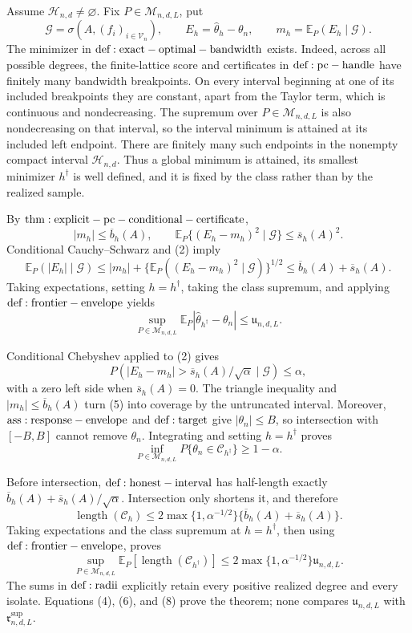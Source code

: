Assume \(\mathcal H_{n,d}\ne\varnothing\).  Fix \(P\in\mathcal M_{n,d,L}\), put
\[
 \mathcal G=\sigma\!\left(A,(f_i)_{i\in\mathcal V_n}\right),
 \qquad E_h=\widehat\theta_h-\theta_n,
 \qquad m_h=\mathbb E_P(E_h\mid\mathcal G).
\tag{1}
\]
The minimizer in \({\rm def:exact-optimal-bandwidth}\) exists.  Indeed, across all possible degrees, the finite-lattice score and certificates in \({\rm def:pc-handle}\) have finitely many bandwidth breakpoints.  On every interval beginning at one of its included breakpoints they are constant, apart from the Taylor term, which is continuous and nondecreasing.  The supremum over \(P\in\mathcal M_{n,d,L}\) is also nondecreasing on that interval, so the interval minimum is attained at its included left endpoint.  There are finitely many such endpoints in the nonempty compact interval \(\mathcal H_{n,d}\).  Thus a global minimum is attained, its smallest minimizer \(h^\dagger\) is well defined, and it is fixed by the class rather than by the realized sample.

By \({\rm thm:explicit-pc-conditional-certificate}\),
\[
 |m_h|\leq\overline b_h(A),
 \qquad
 \mathbb E_P\{(E_h-m_h)^2\mid\mathcal G\}\leq\overline s_h(A)^2.
\tag{2}
\]
Conditional Cauchy--Schwarz and (2) imply
\[
 \mathbb E_P(|E_h|\mid\mathcal G)
 \leq |m_h|+\{\mathbb E_P((E_h-m_h)^2\mid\mathcal G)\}^{1/2}
 \leq\overline b_h(A)+\overline s_h(A).
\tag{3}
\]
Taking expectations, setting \(h=h^\dagger\), taking the class supremum, and applying \({\rm def:frontier-envelope}\) yields
\[
 \sup_{P\in\mathcal M_{n,d,L}}
 \mathbb E_P|\widehat\theta_{h^\dagger}-\theta_n|
 \leq\mathfrak u_{n,d,L}.
\tag{4}
\]

Conditional Chebyshev applied to (2) gives
\[
 P\!\left(|E_h-m_h|>\overline s_h(A)/\sqrt\alpha\mid\mathcal G\right)\leq\alpha,
\tag{5}
\]
with a zero left side when \(\overline s_h(A)=0\).  The triangle inequality and \(|m_h|\leq\overline b_h(A)\) turn (5) into coverage by the untruncated interval.  Moreover, \({\rm ass:response-envelope}\) and \({\rm def:target}\) give \(|\theta_n|\leq B\), so intersection with \([-B,B]\) cannot remove \(\theta_n\).  Integrating and setting \(h=h^\dagger\) proves
\[
 \inf_{P\in\mathcal M_{n,d,L}}P\{\theta_n\in\mathcal C_{h^\dagger}\}\geq1-\alpha.
\tag{6}
\]

Before intersection, \({\rm def:honest-interval}\) has half-length exactly \(\overline b_h(A)+\overline s_h(A)/\sqrt\alpha\).  Intersection only shortens it, and therefore
\[
 \operatorname{length}(\mathcal C_h)
 \leq2\max\{1,\alpha^{-1/2}\}\{\overline b_h(A)+\overline s_h(A)\}.
\tag{7}
\]
Taking expectations and the class supremum at \(h=h^\dagger\), then using \({\rm def:frontier-envelope}\), proves
\[
 \sup_{P\in\mathcal M_{n,d,L}}
 \mathbb E_P[\operatorname{length}(\mathcal C_{h^\dagger})]
 \leq2\max\{1,\alpha^{-1/2}\}\mathfrak u_{n,d,L}.
\tag{8}
\]
The sums in \({\rm def:radii}\) explicitly retain every positive realized degree and every isolate.  Equations (4), (6), and (8) prove the theorem; none compares \(\mathfrak u_{n,d,L}\) with \(\mathfrak r^{\mathrm{sup}}_{n,d,L}\).